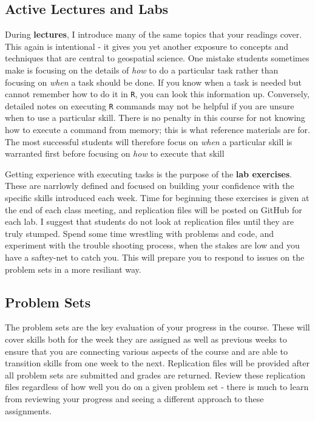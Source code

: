 \documentclass[]{book}
\theoremstyle{definition}
\theoremstyle{definition}
\theoremstyle{definition}
\theoremstyle{remark}
\begin{document}
\subsection{Active Lectures and Labs}\label{active-lectures-and-labs}

During \textbf{lectures}, I introduce many of the same topics that your
readings cover. This again is intentional - it gives you yet another
exposure to concepts and techniques that are central to geospatial
science. One mistake students sometimes make is focusing on the details
of \emph{how} to do a particular task rather than focusing on
\emph{when} a task should be done. If you know when a task is needed but
cannot remember how to do it in \texttt{R}, you can look this
information up. Conversely, detailed notes on executing \texttt{R}
commands may not be helpful if you are unsure when to use a particular
skill. There is no penalty in this course for not knowing how to execute
a command from memory; this is what reference materials are for. The
most successful students will therefore focus on \emph{when} a
particular skill is warranted first before focusing on \emph{how} to
execute that skill

Getting experience with executing tasks is the purpose of the
\textbf{lab exercises}. These are narrlowly defined and focused on
building your confidence with the specific skills introduced each week.
Time for beginning these exercises is given at the end of each class
meeting, and replication files will be posted on GitHub for each lab. I
suggest that students do not look at replication files until they are
truly stumped. Spend some time wrestling with problems and code, and
experiment with the trouble shooting process, when the stakes are low
and you have a saftey-net to catch you. This will prepare you to respond
to issues on the problem sets in a more resiliant way.

\subsection{Problem Sets}\label{problem-sets}

The problem sets are the key evaluation of your progress in the course.
These will cover skills both for the week they are assigned as well as
previous weeks to ensure that you are connecting various aspects of the
course and are able to transition skills from one week to the next.
Replication files will be provided after all problem sets are submitted
and grades are returned. Review these replication files regardless of
how well you do on a given problem set - there is much to learn from
reviewing your progress and seeing a different approach to these
assignments.
\end{document}
